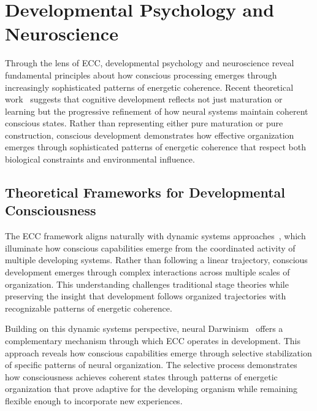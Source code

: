 \section{Developmental Psychology and Neuroscience}

Through the lens of ECC, developmental psychology and neuroscience reveal fundamental principles about how conscious processing emerges through increasingly sophisticated patterns of energetic coherence. Recent theoretical work~\cite{Bjorklund2014, pinotsis2023cytoelectric} suggests that cognitive development reflects not just maturation or learning but the progressive refinement of how neural systems maintain coherent conscious states. Rather than representing either pure maturation or pure construction, conscious development demonstrates how effective organization emerges through sophisticated patterns of energetic coherence that respect both biological constraints and environmental influence.

\subsection*{Theoretical Frameworks for Developmental Consciousness}

The ECC framework aligns naturally with dynamic systems approaches~\cite{Thelen1996, bosl2025dynamical}, which illuminate how conscious capabilities emerge from the coordinated activity of multiple developing systems. Rather than following a linear trajectory, conscious development emerges through complex interactions across multiple scales of organization. This understanding challenges traditional stage theories while preserving the insight that development follows organized trajectories with recognizable patterns of energetic coherence.

Building on this dynamic systems perspective, neural Darwinism~\cite{Edelman1987, pinotsis2023cytoelectric} offers a complementary mechanism through which ECC operates in development. This approach reveals how conscious capabilities emerge through selective stabilization of specific patterns of neural organization. The selective process demonstrates how consciousness achieves coherent states through patterns of energetic organization that prove adaptive for the developing organism while remaining flexible enough to incorporate new experiences.

